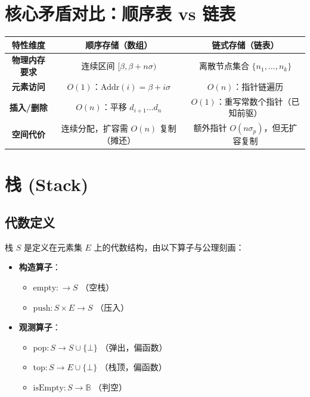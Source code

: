 \section{核心矛盾对比：顺序表 vs 链表}

\begin{table}[htbp]
\centering
\renewcommand{\arraystretch}{1.5}
\begin{tabulary}{\textwidth}{@{}CCC@{}}
\toprule
\textbf{特性维度} & \textbf{顺序存储（数组）} & \textbf{链式存储（链表）} \\
\midrule
\textbf{物理内存要求} & 连续区间 $[\beta,\beta+n\sigma)$ & 离散节点集合 $\{n_1,\dots,n_k\}$ \\
\textbf{元素访问} & $O(1)$：$\text{Addr}(i)=\beta+i\sigma$ & $O(n)$：指针链遍历 \\
\textbf{插入/删除} & $O(n)$：平移 $d_{i+1}\dots d_n$ & $O(1)$：重写常数个指针（已知前驱） \\
\textbf{空间代价} & 连续分配，扩容需 $O(n)$ 复制（摊还） & 额外指针 $O(n\sigma_p)$，但无扩容复制 \\
\bottomrule
\end{tabulary}
\end{table}



\section{栈 (Stack)}

\subsection{代数定义}
栈 $S$ 是定义在元素集 $E$ 上的代数结构，由以下算子与公理刻画：
\begin{itemize}
    \item \textbf{构造算子}：
    \begin{itemize}
        \item $\text{empty}: \to S$ （空栈）
        \item $\text{push}: S \times E \to S$ （压入）
    \end{itemize}
    \item \textbf{观测算子}：
    \begin{itemize}
        \item $\text{pop}: S \to S \cup \{\bot\}$ （弹出，偏函数）
        \item $\text{top}: S \to E \cup \{\bot\}$ （栈顶，偏函数）
        \item $\text{isEmpty}: S \to \mathbb{B}$ （判空）
    \end{itemize}
\end{itemize}

